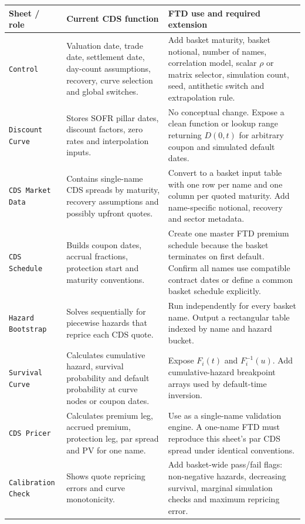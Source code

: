 \documentclass[11pt,a4paper]{article}
\begin{document}
\begin{longtable}{p{3.3cm}p{5.5cm}p{6.0cm}}
\toprule
\textbf{Sheet / role} & \textbf{Current CDS function} & \textbf{FTD use and required extension} \\
\midrule
\endhead

\texttt{Control} &
Valuation date, trade date, settlement date, day-count assumptions, recovery, curve selection and global switches. &
Add basket maturity, basket notional, number of names, correlation model, scalar $\rho$ or matrix selector, simulation count, seed, antithetic switch and extrapolation rule. \\

\texttt{Discount Curve} &
Stores SOFR pillar dates, discount factors, zero rates and interpolation inputs. &
No conceptual change. Expose a clean function or lookup range returning $D(0,t)$ for arbitrary coupon and simulated default dates. \\

\texttt{CDS Market Data} &
Contains single-name CDS spreads by maturity, recovery assumptions and possibly upfront quotes. &
Convert to a basket input table with one row per name and one column per quoted maturity. Add name-specific notional, recovery and sector metadata. \\

\texttt{CDS Schedule} &
Builds coupon dates, accrual fractions, protection start and maturity conventions. &
Create one master FTD premium schedule because the basket terminates on first default. Confirm all names use compatible contract dates or define a common basket schedule explicitly. \\

\texttt{Hazard Bootstrap} &
Solves sequentially for piecewise hazards that reprice each CDS quote. &
Run independently for every basket name. Output a rectangular table indexed by name and hazard bucket. \\

\texttt{Survival Curve} &
Calculates cumulative hazard, survival probability and default probability at curve nodes or coupon dates. &
Expose $F_i(t)$ and $F_i^{-1}(u)$. Add cumulative-hazard breakpoint arrays used by default-time inversion. \\

\texttt{CDS Pricer} &
Calculates premium leg, accrued premium, protection leg, par spread and PV for one name. &
Use as a single-name validation engine. A one-name FTD must reproduce this sheet's par CDS spread under identical conventions. \\

\texttt{Calibration Check} &
Shows quote repricing errors and curve monotonicity. &
Add basket-wide pass/fail flags: non-negative hazards, decreasing survival, marginal simulation checks and maximum repricing error. \\

\bottomrule
\end{longtable}
\end{document}
